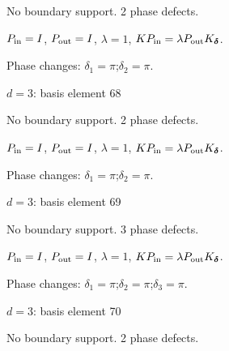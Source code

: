 No boundary support. 2 phase defects.
\begin{center}
\end{center}
\vspace{-1mm}
$P_{\rm in}=I$, \quad $P_{\rm out}=I$, \quad $\lambda=1$, \qquad $K P_{\rm in}=\lambda P_{\rm out}K_{\boldsymbol\delta}$.
\par\smallskip\begin{minipage}{.98\linewidth}\small Phase changes: $\delta_{1}=\pi$;\quad $\delta_{2}=\pi$.\end{minipage}
\vfill
{\footnotesize\texttt{}}
\newpage
{}
{\Large $d=3$: basis element 68}\par
No boundary support. 2 phase defects.
\begin{center}
\end{center}
\vspace{-1mm}
$P_{\rm in}=I$, \quad $P_{\rm out}=I$, \quad $\lambda=1$, \qquad $K P_{\rm in}=\lambda P_{\rm out}K_{\boldsymbol\delta}$.
\par\smallskip\begin{minipage}{.98\linewidth}\small Phase changes: $\delta_{1}=\pi$;\quad $\delta_{2}=\pi$.\end{minipage}
\vfill
{\footnotesize\texttt{}}
\newpage
{}
{\Large $d=3$: basis element 69}\par
No boundary support. 3 phase defects.
\begin{center}
\end{center}
\vspace{-1mm}
$P_{\rm in}=I$, \quad $P_{\rm out}=I$, \quad $\lambda=1$, \qquad $K P_{\rm in}=\lambda P_{\rm out}K_{\boldsymbol\delta}$.
\par\smallskip\begin{minipage}{.98\linewidth}\small Phase changes: $\delta_{1}=\pi$;\quad $\delta_{2}=\pi$;\quad $\delta_{3}=\pi$.\end{minipage}
\vfill
{\footnotesize\texttt{}}
\newpage
{}
{\Large $d=3$: basis element 70}\par
No boundary support. 2 phase defects.
\begin{center}
\end{center}
